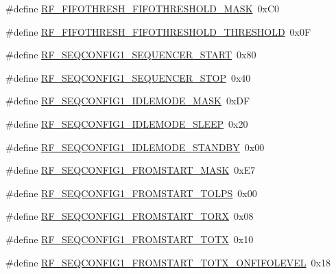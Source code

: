 \begin{DoxyCompactItemize}
\#define \mbox{\hyperlink{sx1276_regs-_fsk_8h_a11133eab9006138c972b4bbbbcc38ef9}{R\+F\+\_\+\+F\+I\+F\+O\+T\+H\+R\+E\+S\+H\+\_\+\+F\+I\+F\+O\+T\+H\+R\+E\+S\+H\+O\+L\+D\+\_\+\+M\+A\+SK}}~0x\+C0
\item 
\#define \mbox{\hyperlink{sx1276_regs-_fsk_8h_a157d89bed834c9fe81aa8b0a653526c3}{R\+F\+\_\+\+F\+I\+F\+O\+T\+H\+R\+E\+S\+H\+\_\+\+F\+I\+F\+O\+T\+H\+R\+E\+S\+H\+O\+L\+D\+\_\+\+T\+H\+R\+E\+S\+H\+O\+LD}}~0x0F
\item 
\#define \mbox{\hyperlink{sx1276_regs-_fsk_8h_a9374284f8d161876adbfe106d58dd77d}{R\+F\+\_\+\+S\+E\+Q\+C\+O\+N\+F\+I\+G1\+\_\+\+S\+E\+Q\+U\+E\+N\+C\+E\+R\+\_\+\+S\+T\+A\+RT}}~0x80
\item 
\#define \mbox{\hyperlink{sx1276_regs-_fsk_8h_a77b3c19d8d12e5acfe979ab731df8a06}{R\+F\+\_\+\+S\+E\+Q\+C\+O\+N\+F\+I\+G1\+\_\+\+S\+E\+Q\+U\+E\+N\+C\+E\+R\+\_\+\+S\+T\+OP}}~0x40
\item 
\#define \mbox{\hyperlink{sx1276_regs-_fsk_8h_af2acf1e69aca7c8fcd98b364903512c8}{R\+F\+\_\+\+S\+E\+Q\+C\+O\+N\+F\+I\+G1\+\_\+\+I\+D\+L\+E\+M\+O\+D\+E\+\_\+\+M\+A\+SK}}~0x\+DF
\item 
\#define \mbox{\hyperlink{sx1276_regs-_fsk_8h_aeb8f9f145245df6d737b93f2d26cdc3a}{R\+F\+\_\+\+S\+E\+Q\+C\+O\+N\+F\+I\+G1\+\_\+\+I\+D\+L\+E\+M\+O\+D\+E\+\_\+\+S\+L\+E\+EP}}~0x20
\item 
\#define \mbox{\hyperlink{sx1276_regs-_fsk_8h_a4994de24c1c0ada3cba71f4cb9ff91db}{R\+F\+\_\+\+S\+E\+Q\+C\+O\+N\+F\+I\+G1\+\_\+\+I\+D\+L\+E\+M\+O\+D\+E\+\_\+\+S\+T\+A\+N\+D\+BY}}~0x00
\item 
\#define \mbox{\hyperlink{sx1276_regs-_fsk_8h_a842ad530378141c3522950f4ed4a6278}{R\+F\+\_\+\+S\+E\+Q\+C\+O\+N\+F\+I\+G1\+\_\+\+F\+R\+O\+M\+S\+T\+A\+R\+T\+\_\+\+M\+A\+SK}}~0x\+E7
\item 
\#define \mbox{\hyperlink{sx1276_regs-_fsk_8h_a180dc23f59acdec302255e7fe8fdd7b5}{R\+F\+\_\+\+S\+E\+Q\+C\+O\+N\+F\+I\+G1\+\_\+\+F\+R\+O\+M\+S\+T\+A\+R\+T\+\_\+\+T\+O\+L\+PS}}~0x00
\item 
\#define \mbox{\hyperlink{sx1276_regs-_fsk_8h_a41fd3a8ddc9ada2815a3fab3da9f285f}{R\+F\+\_\+\+S\+E\+Q\+C\+O\+N\+F\+I\+G1\+\_\+\+F\+R\+O\+M\+S\+T\+A\+R\+T\+\_\+\+T\+O\+RX}}~0x08
\item 
\#define \mbox{\hyperlink{sx1276_regs-_fsk_8h_aa2d23a14e3b777e4facefba5816e2d77}{R\+F\+\_\+\+S\+E\+Q\+C\+O\+N\+F\+I\+G1\+\_\+\+F\+R\+O\+M\+S\+T\+A\+R\+T\+\_\+\+T\+O\+TX}}~0x10
\item 
\#define \mbox{\hyperlink{sx1276_regs-_fsk_8h_aa02ee770e23b0c4a96bcc52f0766f36a}{R\+F\+\_\+\+S\+E\+Q\+C\+O\+N\+F\+I\+G1\+\_\+\+F\+R\+O\+M\+S\+T\+A\+R\+T\+\_\+\+T\+O\+T\+X\+\_\+\+O\+N\+F\+I\+F\+O\+L\+E\+V\+EL}}~0x18

\end{DoxyCompactItemize}

